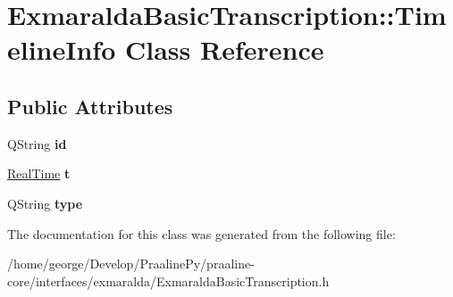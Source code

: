 \hypertarget{class_exmaralda_basic_transcription_1_1_timeline_info}{}\section{Exmaralda\+Basic\+Transcription\+:\+:Timeline\+Info Class Reference}
\label{class_exmaralda_basic_transcription_1_1_timeline_info}
\subsection*{Public Attributes}
\begin{DoxyCompactItemize}
\item 
\mbox{\label{class_exmaralda_basic_transcription_1_1_timeline_info_a32a40a08bbe6f7dbfee6ea659b585726}} 
Q\+String {\bfseries id}
\item 
\mbox{\label{class_exmaralda_basic_transcription_1_1_timeline_info_a55421f0d25d51b82115c27a60e31af60}} 
\hyperlink{struct_real_time}{Real\+Time} {\bfseries t}
\item 
\mbox{\label{class_exmaralda_basic_transcription_1_1_timeline_info_ab0b80d45484d04bda5de9d40f2905388}} 
Q\+String {\bfseries type}
\end{DoxyCompactItemize}


The documentation for this class was generated from the following file\+:\begin{DoxyCompactItemize}
\item 
/home/george/\+Develop/\+Praaline\+Py/praaline-\/core/interfaces/exmaralda/Exmaralda\+Basic\+Transcription.\+h\end{DoxyCompactItemize}
